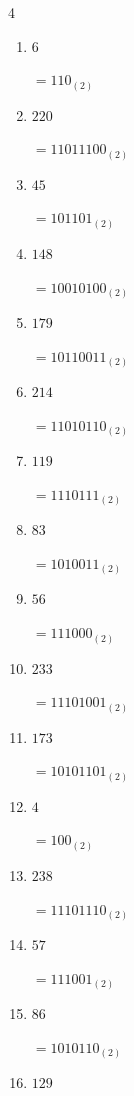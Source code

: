 \begin{multicols}{4}
\begin{enumerate}
        $=11010101_{(2)}$

  \item $6$

        $=110_{(2)}$

  \item $220$

        $=11011100_{(2)}$

  \item $45$

        $=101101_{(2)}$

  \item $148$

        $=10010100_{(2)}$

  \item $179$

        $=10110011_{(2)}$

  \item $214$

        $=11010110_{(2)}$

  \item $119$

        $=1110111_{(2)}$

  \item $83$

        $=1010011_{(2)}$

\columnbreak %

  \item $56$

        $=111000_{(2)}$

  \item $233$

        $=11101001_{(2)}$

  \item $173$

        $=10101101_{(2)}$

  \item $4$

        $=100_{(2)}$

  \item $238$

        $=11101110_{(2)}$

  \item $57$

        $=111001_{(2)}$

  \item $86$

        $=1010110_{(2)}$

  \item $129$


\end{enumerate}
\end{multicols}
